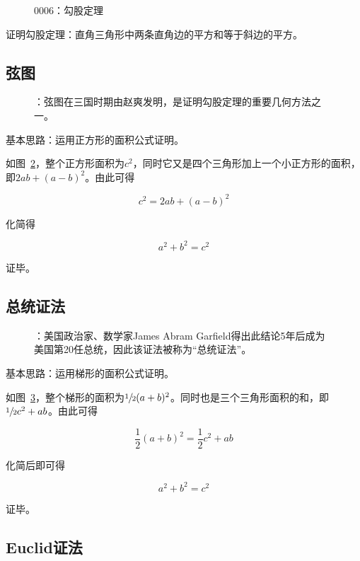 

\begin{figure}[htbp]
  \centering
  \caption{0006：勾股定理} \label{fig:0006}
\end{figure}

证明勾股定理：直角三角形中两条直角边的平方和等于斜边的平方。

\subsection{弦图} \label{subsec:0006-xiantu}

\begin{figure}[htbp]
  \centering
  \caption{：弦图在三国时期由赵爽发明，是证明勾股定理的重要几何方法之一。}
  \label{fig:0006-xiantu}
\end{figure}

基本思路：运用正方形的面积公式证明。

如图~\ref{fig:0006-xiantu}，整个正方形面积为$c^2$，同时它又是四个三角形加上一个小正方形的面积，即$2ab + (a - b)^2$。由此可得

\[ c^2 = 2ab + (a - b)^2 \]

化简得

\[ a^2 + b^2 = c^2 \]

证毕。

\subsection{总统证法} \label{subsec:0006-pres}

\begin{figure}[htbp]
  \centering
  \caption{：美国政治家、数学家James Abram Garfield得出此结论5年后成为美国第20任总统，因此该证法被称为“总统证法”。}
  \label{fig:0006-pres}
\end{figure}

基本思路：运用梯形的面积公式证明。

如图~\ref{fig:0006-pres}，整个梯形的面积为$\sfrac12(a + b)^2$。同时也是三个三角形面积的和，即$\sfrac12c^2 + ab$。由此可得

\[ \frac12(a + b)^2 = \frac12c^2 + ab \]

化简后即可得

\[ a^2 + b^2 = c^2 \]

证毕。

\subsection{Euclid证法} \label{subsec:0006-eu}

